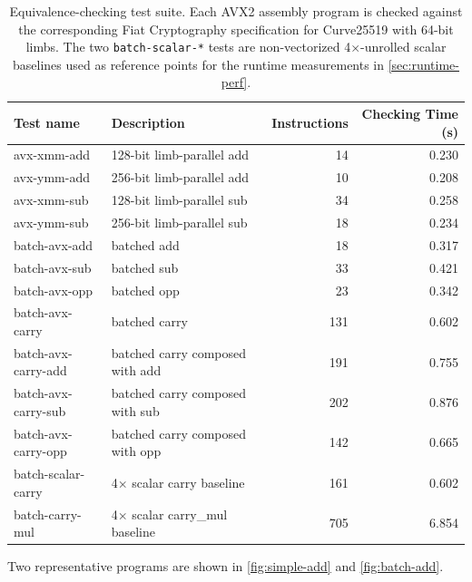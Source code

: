 \begin{table}[h]
\centering
\begin{tabular}{llrr}
\toprule
\textbf{Test name} & \textbf{Description} & \textbf{Instructions} & \textbf{Checking Time (s)} \\
\midrule
avx-xmm-add         & 128-bit limb-parallel add            &  14 & 0.230 \\
avx-ymm-add         & 256-bit limb-parallel add            &  10 & 0.208 \\
avx-xmm-sub         & 128-bit limb-parallel sub            &  34 & 0.258 \\
avx-ymm-sub         & 256-bit limb-parallel sub            &  18 & 0.234 \\
batch-avx-add       & batched add                          &  18 & 0.317 \\
batch-avx-sub       & batched sub                          &  33 & 0.421 \\
batch-avx-opp       & batched opp                          &  23 & 0.342 \\
batch-avx-carry     & batched carry                        & 131 & 0.602 \\
batch-avx-carry-add & batched carry composed with add      & 191 & 0.755 \\
batch-avx-carry-sub & batched carry composed with sub      & 202 & 0.876 \\
batch-avx-carry-opp & batched carry composed with opp      & 142 & 0.665 \\
batch-scalar-carry  & 4$\times$ scalar carry baseline      & 161 & 0.602 \\
batch-carry-mul     & 4$\times$ scalar carry\_mul baseline & 705 & 6.854 \\
\bottomrule
\end{tabular}
\caption{Equivalence-checking test suite. Each AVX2 assembly program is checked against the corresponding Fiat Cryptography specification for Curve25519 with 64-bit limbs. The two \texttt{batch-scalar-*} tests are non-vectorized 4$\times$-unrolled scalar baselines used as reference points for the runtime measurements in \autoref{sec:runtime-perf}.}
\label{tab:results}
\end{table}

Two representative programs are shown in \autoref{fig:simple-add} and \autoref{fig:batch-add}.

